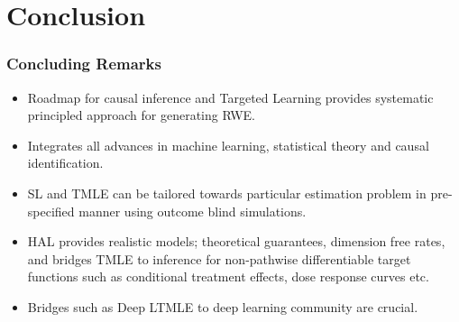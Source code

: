 \documentclass[t]{beamer}
\begin{document}
\section{Conclusion}
\begin{frame}\frametitle{Concluding Remarks}
\begin{itemize}
\item Roadmap for causal inference and Targeted Learning provides systematic principled approach for generating RWE.
\item Integrates all advances in machine learning, statistical theory and causal identification.
\item SL and TMLE can be tailored towards particular estimation problem in pre-specified manner using outcome blind simulations.
\item HAL provides realistic models;  theoretical guarantees, dimension free rates,  and bridges TMLE to inference for non-pathwise differentiable target functions such as conditional treatment effects, dose response curves etc. 
\item Bridges such as Deep LTMLE to deep learning community are crucial. 
\end{itemize}
\end{frame}
\end{document}
